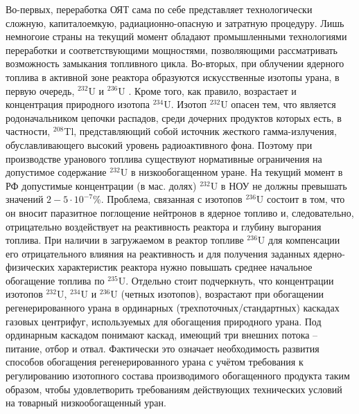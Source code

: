 Во-первых, переработка ОЯТ сама по себе представляет технологически сложную, капиталоемкую, радиационно-опасную и затратную процедуру. Лишь немногоие страны на текущий момент обладают промышленными технологиями переработки и соответствующими мощностями, позволяющими рассматривать возможность замыкания топливного цикла.
Во-вторых, при облучении ядерного топлива в активной зоне реактора образуются искусственные изотопы урана, в первую очередь, $^{232}$U и $^{236}$U . Кроме того, как правило, возрастает и концентрация природного изотопа $^{234}$U. Изотоп $^{232}$U опасен тем, что является родоначальником цепочки распадов, среди дочерних продуктов которых есть,  в частности, $^{208}$Tl, представляющий собой источник жесткого гамма-излучения, обуславливающего высокий уровень радиоактивного фона. Поэтому при производстве уранового топлива существуют нормативные ограничения на допустимое содержание $^{232}$U в низкообогащенном уране. На текущий момент в РФ допустимые концентрации (в мас. долях) $^{232}$U в НОУ не должны превышать значений $2-5\cdot10^{-7}$\%. Проблема, связанная с изотопов $^{236}$U состоит в том, что он вносит паразитное поглощение нейтронов в ядерное топливо и, следовательно, отрицательно воздействует на реактивность реактора и глубину выгорания топлива. При наличии в загружаемом в реактор топливе $^{236}$U  для компенсации его отрицательного влияния на реактивность и для получения заданных ядерно-физических характеристик реактора нужно повышать среднее начальное обогащение топлива по $^{235}$U.  Отдельно стоит подчеркнуть, что концентрации изотопов $^{232}$U, $^{234}$U и $^{236}$U (четных изотопов), возрастают при обогащении регенерированного урана в ординарных (трехпоточных/стандартных) каскадах газовых центрифуг, используемых для обогащения природного урана. Под ординарным каскадом понимают каскад, имеющий три внешних потока -- питание, отбор и отвал. Фактически это означает необходимость развития способов обогащения регенерированного урана с учётом требования к регулированию изотопного состава производимого обогащенного продукта таким образом, чтобы удовлетворить требованиям действующих технических условий на товарный низкообогащенный уран.

